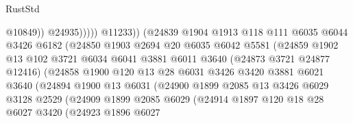 \begin{lexlean}{RustStd}
\begin{coremodule}
                                          @10849))
                                      @24935)))))
                            @11233))
                        (@24839
                          @1904
                          @1913
                          @118
                          @111
                          @6035
                          @6044
                          @3426
                          @6182
                          (@24850
                            @1903
                            @2694
                            @20
                            @6035
                            @6042
                            @5581
                            (@24859
                              @1902
                              @13
                              @102
                              @3721
                              @6034
                              @6041
                              @3881
                              @6011
                              @3640
                              (@24873 @3721 @24877 @12416)
                              (@24858
                                @1900
                                @120
                                @13
                                @28
                                @6031
                                @3426
                                @3420
                                @3881
                                @6021
                                @3640
                                (@24894
                                  @1900
                                  @13
                                  @6031
                                  (@24900
                                    @1899
                                    @2085
                                    @13
                                    @3426
                                    @6029
                                    @3128
                                    @2529
                                    (@24909
                                      @1899
                                      @2085
                                      @6029
                                      (@24914
                                        @1897
                                        @120
                                        @18
                                        @28
                                        @6027
                                        @3420
                                        (@24923
                                          @1896
                                          @6027

\end{coremodule}
\end{lexlean}
